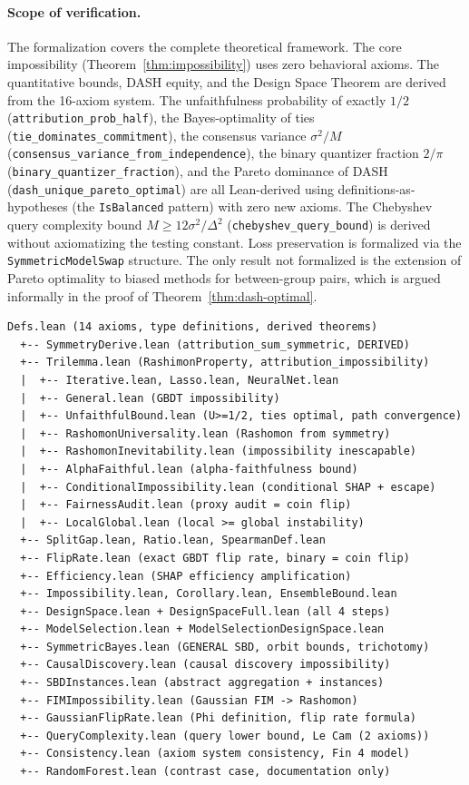 \documentclass{article}
\begin{document}
\paragraph{Scope of verification.}
\begin{sloppypar}
The formalization covers the complete theoretical framework. The core impossibility
(Theorem~\ref{thm:impossibility}) uses zero behavioral axioms. The quantitative
bounds, DASH equity, and the Design Space Theorem are derived from the 16-axiom
system. The unfaithfulness probability of exactly $1/2$
(\texttt{attribution\allowbreak\_prob\allowbreak\_half}), the Bayes-optimality of
ties (\texttt{tie\allowbreak\_dominates\allowbreak\_commitment}), the consensus
variance $\sigma^2/M$
(\texttt{consensus\allowbreak\_variance\allowbreak\_from\allowbreak\_independence}),
the binary quantizer fraction $2/\pi$
(\texttt{binary\allowbreak\_quantizer\allowbreak\_fraction}), and the Pareto
dominance of DASH (\texttt{dash\allowbreak\_unique\allowbreak\_pareto\allowbreak\_optimal})
are all Lean-derived using definitions-as-hypotheses (the \texttt{IsBalanced}
pattern) with zero new axioms. The Chebyshev query complexity bound
$M \geq 12\sigma^2/\Delta^2$
(\texttt{chebyshev\allowbreak\_query\allowbreak\_bound}) is derived without
axiomatizing the testing constant. Loss preservation is formalized via the
\texttt{SymmetricModelSwap} structure. The only result not formalized is the
extension of Pareto optimality to biased methods for between-group pairs, which
is argued informally in the proof of Theorem~\ref{thm:dash-optimal}.
\end{sloppypar}

{\small\begin{verbatim}
Defs.lean (14 axioms, type definitions, derived theorems)
  +-- SymmetryDerive.lean (attribution_sum_symmetric, DERIVED)
  +-- Trilemma.lean (RashimonProperty, attribution_impossibility)
  |  +-- Iterative.lean, Lasso.lean, NeuralNet.lean
  |  +-- General.lean (GBDT impossibility)
  |  +-- UnfaithfulBound.lean (U>=1/2, ties optimal, path convergence)
  |  +-- RashomonUniversality.lean (Rashomon from symmetry)
  |  +-- RashomonInevitability.lean (impossibility inescapable)
  |  +-- AlphaFaithful.lean (alpha-faithfulness bound)
  |  +-- ConditionalImpossibility.lean (conditional SHAP + escape)
  |  +-- FairnessAudit.lean (proxy audit = coin flip)
  |  +-- LocalGlobal.lean (local >= global instability)
  +-- SplitGap.lean, Ratio.lean, SpearmanDef.lean
  +-- FlipRate.lean (exact GBDT flip rate, binary = coin flip)
  +-- Efficiency.lean (SHAP efficiency amplification)
  +-- Impossibility.lean, Corollary.lean, EnsembleBound.lean
  +-- DesignSpace.lean + DesignSpaceFull.lean (all 4 steps)
  +-- ModelSelection.lean + ModelSelectionDesignSpace.lean
  +-- SymmetricBayes.lean (GENERAL SBD, orbit bounds, trichotomy)
  +-- CausalDiscovery.lean (causal discovery impossibility)
  +-- SBDInstances.lean (abstract aggregation + instances)
  +-- FIMImpossibility.lean (Gaussian FIM -> Rashomon)
  +-- GaussianFlipRate.lean (Phi definition, flip rate formula)
  +-- QueryComplexity.lean (query lower bound, Le Cam (2 axioms))
  +-- Consistency.lean (axiom system consistency, Fin 4 model)
  +-- RandomForest.lean (contrast case, documentation only)
\end{verbatim}}
\end{document}
